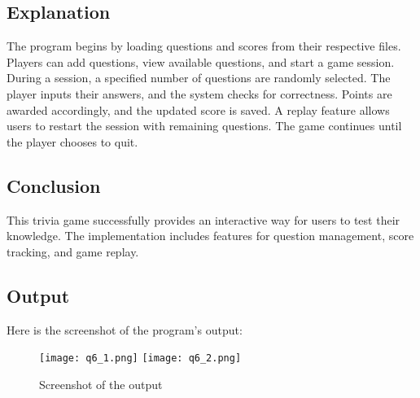 \documentclass{article}
\begin{document}
\subsection{Explanation}
The program begins by loading questions and scores from their respective files. Players can add questions, view available questions, and start a game session. During a session, a specified number of questions are randomly selected. The player inputs their answers, and the system checks for correctness. Points are awarded accordingly, and the updated score is saved.
A replay feature allows users to restart the session with remaining questions. The game continues until the player chooses to quit.
\subsection{Conclusion}
This trivia game successfully provides an interactive way for users to test their knowledge. The implementation includes features for question management, score tracking, and game replay.
\subsection{Output}
Here is the screenshot of the program's output:
\begin{figure}[h!]
    \centering
    \texttt{[image: q6\_1.png]} 
     \texttt{[image: q6\_2.png]} 
    \caption{Screenshot of the output}
    
\end{figure}
\end{document}

